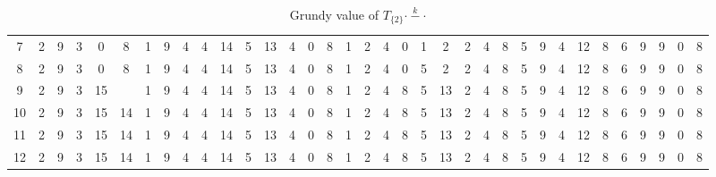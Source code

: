 \documentclass[12pt]{elsarticle}
\newtheorem*{theorem A}{Theorem A}
\newtheorem*{theorem B}{N\"olker's Theorem}
\theoremstyle{remark}
\theoremstyle{remark}
\theoremstyle{definition}
\begin{document}
\begin{landscape}
\begin{table}[]
{\begin{tabular}{c|cccccccccccccccccccccccccccccccccc}
				7  & 2 & 9 & 3 & 0  & 8  & 1 & 9 & 4 & 4 & 14 & 5  & 13 & 4  & 0  & 8  & 1  & 2  & 4  & 0  & 1  & 2  & 2  & 4  & 8  & 5  & 9  & 4  & 12 & 8  & 6  & 9  & 9  & 0  & 8  \\
				8  & 2 & 9 & 3 & 0  & 8  & 1 & 9 & 4 & 4 & 14 & 5  & 13 & 4  & 0  & 8  & 1  & 2  & 4  & 0  & 5  & 2  & 2  & 4  & 8  & 5  & 9  & 4  & 12 & 8  & 6  & 9  & 9  & 0  & 8  \\
				9  & 2 & 9 & 3 & 15 & \boxed{\textbf{8}}  & 1 & 9 & 4 & 4 & 14 & 5  & 13 & 4  & 0  & 8  & 1  & 2  & 4  & 8  & 5  & 13 & 2  & 4  & 8  & 5  & 9  & 4  & 12 & 8  & 6  & 9  & 9  & 0  & 8  \\
				10 & 2 & 9 & 3 & 15 & 14 & 1 & 9 & 4 & 4 & 14 & 5  & 13 & 4  & 0  & 8  & 1  & 2  & 4  & 8  & 5  & 13 & 2  & 4  & 8  & 5  & 9  & 4  & 12 & 8  & 6  & 9  & 9  & 0  & 8  \\
				11 & 2 & 9 & 3 & 15 & 14 & 1 & 9 & 4 & 4 & 14 & 5  & 13 & 4  & 0  & 8  & 1  & 2  & 4  & 8  & 5  & 13 & 2  & 4  & 8  & 5  & 9  & 4  & 12 & 8  & 6  & 9  & 9  & 0  & 8  \\
				12 & 2 & 9 & 3 & 15 & 14 & 1 & 9 & 4 & 4 & 14 & 5  & 13 & 4  & 0  & 8  & 1  & 2  & 4  & 8  & 5  & 13 & 2  & 4  & 8  & 5  & 9  & 4  & 12 & 8  & 6  & 9  & 9  & 0  & 8 
		\end{tabular}}
		\caption{Grundy value of $T_{\{2\}}\stackrel{k}{\cdot - \cdot}$ \label{T2k}}
	\end{table}
	\begin{table}[]
		\centering
\end{table}
\end{landscape}
\end{document}
